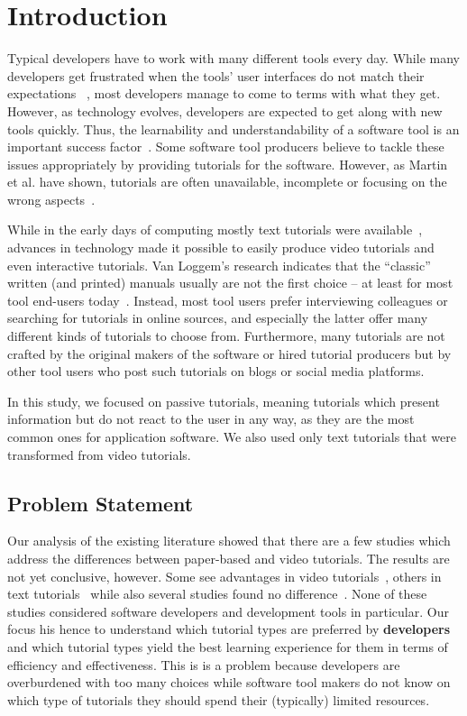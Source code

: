 
\section{Introduction}
Typical developers have to work with many different tools every day. While many developers get frustrated when the tools' user interfaces do not match their expectations ~\cite{lazar}, most developers manage to come to terms with what they get. However, as technology evolves, developers are expected to get along with new tools quickly. Thus, the learnability and understandability of a software tool is an important success factor~\cite{dix, grossman2}. Some software tool producers believe to tackle these issues appropriately by providing tutorials for the software. However, as Martin et al. have shown, tutorials are often unavailable, incomplete or focusing on the wrong aspects~\cite{martin}.

While in the early days of computing mostly text tutorials were available~\cite{texts}, advances in technology made it possible to easily produce video tutorials and even interactive tutorials. Van Loggem's research indicates that the \enquote{classic} written (and printed) manuals usually are not the first choice -- at least for most tool end-users today~\cite{loggem}. Instead, most tool users prefer interviewing colleagues or searching for tutorials in online sources, and especially the latter offer many different kinds of tutorials to choose from. Furthermore, many tutorials are not crafted by the original makers of the software or hired tutorial producers but by other tool users who post such tutorials on blogs or social media platforms.

In this study, we focused on passive tutorials, meaning tutorials which present information but do not react to the user in any way, as they are the most common ones for application software. We also used only text tutorials that were transformed from video tutorials. 



\subsection{Problem Statement}
Our analysis of the existing literature showed that there are a few studies which address the differences between paper-based and video tutorials. The results are not yet conclusive, however. Some see advantages in video tutorials~\cite{baecker, vanderMeij, lloyd}, others in text tutorials~\cite{mestre} while also several studies found no difference~\cite{payne, alexander, deVaney}. None of these studies considered software developers and development tools in particular. Our focus his hence to understand which tutorial types are preferred by \textbf{developers} and which tutorial types yield the best learning experience for them in terms of efficiency and effectiveness. This is is a problem because developers are overburdened with too many choices while software tool makers do not know on which type of tutorials they should spend their (typically) limited resources. 


